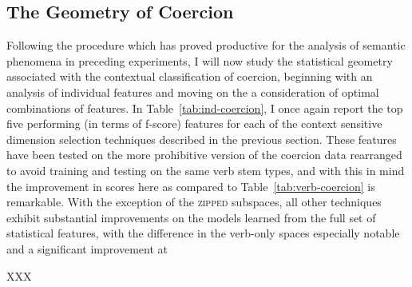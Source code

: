 \subsection{The Geometry of Coercion}
Following the procedure which has proved productive for the analysis of semantic phenomena in preceding experiments, I will now study the statistical geometry associated with the contextual classification of coercion, beginning with an analysis of individual features and moving on the a consideration of optimal combinations of features.  In Table~\ref{tab:ind-coercion}, I once again report the top five performing (in terms of f-score) features for each of the context sensitive dimension selection techniques described in the previous section.  These features have been tested on the more prohibitive version of the coercion data rearranged to avoid training and testing on the same verb stem types, and with this in mind the improvement in scores here as compared to Table~\ref{tab:verb-coercion} is remarkable.  With the exception of the \textsc{zipped} subspaces, all other techniques exhibit substantial improvements on the models learned from the full set of statistical features, with the difference in the verb-only spaces especially notable and a significant improvement at 

XXX


